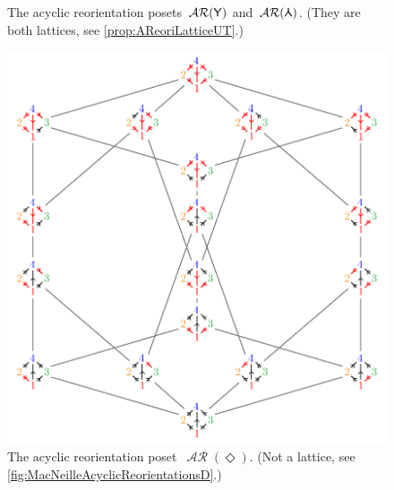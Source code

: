 \documentclass{amsart}
\theoremstyle{definition}
\renewcommand{\c}[1]{\mathcal{#1}} %
\DeclareMathOperator{\AReori}{\c{AR}}  %
\newcommand{\Ygraph}{\sf Y} %
\newcommand{\Dgraph}{\boldsymbol{\Diamond}} %
\newcommand{\Agraph}{\rotatebox[origin=c]{180}{\sf Y}} %
\begin{document}
\begin{figure}
	\caption{The acyclic reorientation posets~$\AReori(\Ygraph)$ and~$\AReori(\Agraph)$. (They are both lattices, see \cref{prop:AReoriLatticeUT}.)}
	\label{fig:acyclicReorientationsAY}
\end{figure}

\begin{figure}
	\centerline{\includegraphics[scale=.68]{acyclicReorientationsD}}
	\caption{The acyclic reorientation poset~$\AReori(\Dgraph)$. (Not a lattice, see \cref{fig:MacNeilleAcyclicReorientationsD}.)}
	\label{fig:acyclicReorientationsD}
\end{figure}
\end{document}
